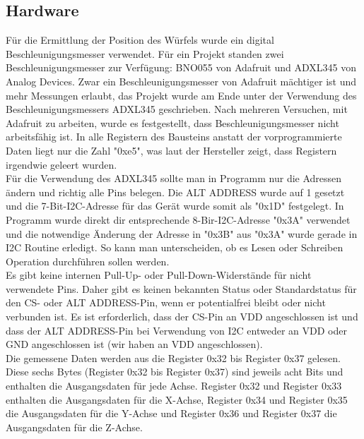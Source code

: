 
\subsection{Hardware}
Für die Ermittlung der Position des Würfels wurde ein digital Beschleunigungsmesser verwendet. Für ein Projekt standen zwei Beschleunigungsmesser zur Verfügung: BNO055 von Adafruit und ADXL345 von Analog Devices. Zwar ein Beschleunigungsmesser von Adafruit mächtiger ist und mehr Messungen erlaubt, das Projekt wurde am Ende unter der Verwendung des Beschleunigungsmessers ADXL345 geschrieben. Nach mehreren Versuchen, mit Adafruit zu arbeiten, wurde es festgestellt, dass Beschleunigungsmesser nicht arbeitsfähig ist. In alle Registern des Bausteins anstatt der vorprogrammierte Daten liegt nur die Zahl "0xe5", was laut der Hersteller zeigt, dass Registern irgendwie geleert wurden.\\

Für die Verwendung des ADXL345 sollte man in Programm nur die Adressen ändern und richtig alle Pins belegen. Die ALT ADDRESS wurde auf 1 gesetzt und die 7-Bit-I2C-Adresse für das Gerät wurde somit als "0x1D" festgelegt. In Programm wurde direkt dir entsprechende 8-Bir-I2C-Adresse "0x3A" verwendet und die notwendige Änderung der Adresse in "0x3B" aus "0x3A" wurde gerade in I2C Routine erledigt. So kann man unterscheiden, ob es Lesen oder Schreiben Operation durchführen sollen werden. \\

Es gibt keine internen Pull-Up- oder Pull-Down-Widerstände für nicht verwendete Pins. Daher gibt es keinen bekannten Status oder Standardstatus für den CS- oder ALT ADDRESS-Pin, wenn er potentialfrei bleibt oder nicht verbunden ist. Es ist erforderlich, dass der CS-Pin an VDD  angeschlossen ist und dass der ALT ADDRESS-Pin bei Verwendung von I2C entweder an VDD oder GND angeschlossen ist (wir haben an VDD angeschlossen).\\

Die gemessene Daten werden aus die Register 0x32 bis Register 0x37 gelesen. Diese sechs Bytes (Register 0x32 bis Register 0x37) sind jeweils acht Bits und enthalten die Ausgangsdaten für jede Achse. Register 0x32 und Register 0x33 enthalten die Ausgangsdaten für die X-Achse, Register 0x34 und Register 0x35 die Ausgangsdaten für die Y-Achse und Register 0x36 und Register 0x37 die Ausgangsdaten für die Z-Achse. \\

